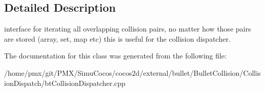 \subsection{Detailed Description}
interface for iterating all overlapping collision pairs, no matter how those pairs are stored (array, set, map etc) this is useful for the collision dispatcher. 

The documentation for this class was generated from the following file\+:\begin{DoxyCompactItemize}
\item 
/home/pmx/git/\+P\+M\+X/\+Simu\+Cocos/cocos2d/external/bullet/\+Bullet\+Collision/\+Collision\+Dispatch/bt\+Collision\+Dispatcher.\+cpp\end{DoxyCompactItemize}
